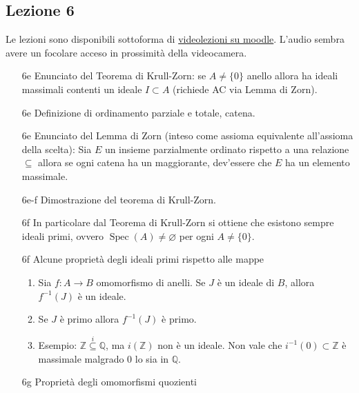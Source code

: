 \documentclass[italian]{article}
\begin{document}
    \subsection{Lezione 6}

    Le lezioni sono disponibili sottoforma di 
    \href{https://didatticaonline.unitn.it/dol/course/view.php?id=23268}{videolezioni
    su moodle}. L'audio sembra avere un focolare acceso in prossimità della
    videocamera.
    
    \begin{enumerate}
      \item[6e] Enunciato del Teorema di Krull-Zorn: se $A \neq \{0\}$
        anello allora ha ideali massimali contenti un ideale $I \subset A$ 
        (richiede AC via Lemma di Zorn).
      \item[6e] Definizione di ordinamento parziale e totale, catena. 
      \item[6e] Enunciato del Lemma di Zorn (inteso come assioma equivalente
        all'assioma della scelta): Sia $E$ un insieme parzialmente
        ordinato rispetto a una relazione $\subseteq$ allora se ogni catena ha
        un maggiorante, dev'essere che $E$ ha un elemento massimale. 
      \item[6e-f] Dimostrazione del teorema di Krull-Zorn. 
      \item[6f] In particolare dal Teorema di Krull-Zorn si ottiene che esistono
        sempre ideali primi, ovvero $\operatorname{Spec}(A) \neq
        \varnothing$ per ogni $A \neq \{0\}$. 
      \item[6f] Alcune proprietà degli ideali primi rispetto alle mappe
        \begin{enumerate}
          \item Sia $f \colon A \to B$ omomorfismo di anelli. Se $J$ è un
            ideale di $B$, allora $f^{-1}(J)$ è un ideale.
          \item Se $J$ è primo allora $f^{-1}(J)$ è primo.
          \item Esempio: $\mathbb{Z} \overset{i}{\subseteq} \mathbb{Q}$, ma
            $i(\mathbb{Z})$ non è un ideale. Non vale che $i^{-1}(0) \subset
            \mathbb{Z}$ è massimale malgrado $0$ lo sia in $\mathbb{Q}$.
      \end{enumerate}
    \item[6g] Proprietà degli omomorfismi quozienti  
\end{enumerate}
\end{document}
